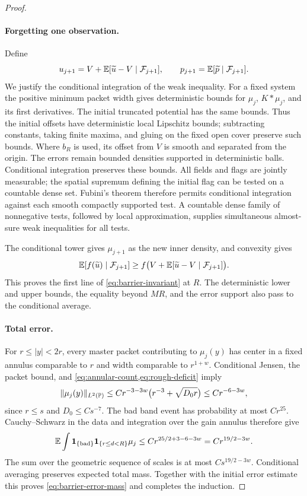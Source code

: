 \begin{proof}
\paragraph{Forgetting one observation.}
Define
\[
 u_{j+1}=V+\mathbb E[\widetilde u-V\mid\mathcal F_{j+1}],
 \qquad
 p_{j+1}=\mathbb E[\widetilde p\mid\mathcal F_{j+1}].
\]
We justify the conditional integration of the weak inequality.
For a fixed system the positive minimum packet width gives
deterministic bounds for $\mu_j$, $K*\mu_j$, and its first
derivatives.  The initial truncated potential has the same bounds.
Thus the initial offsets have deterministic local Lipschitz bounds;
subtracting constants, taking finite maxima, and gluing on the fixed
open cover preserve such bounds.  Where $b_R$ is used, its offset
from $V$ is smooth and separated from the origin.  The errors remain
bounded densities supported in deterministic balls.  Conditional
integration preserves these bounds.  All fields and flags are jointly
measurable; the spatial supremum defining the initial flag can be
tested on a countable dense set.  Fubini's theorem therefore permits
conditional integration against each smooth compactly supported
test.  A countable dense family of nonnegative tests, followed by
local approximation, supplies simultaneous almost-sure weak
inequalities for all tests.

The conditional tower gives $\mu_{j+1}$ as the new inner density,
and convexity gives
\[
 \mathbb E[f(\widetilde u)\mid\mathcal F_{j+1}]
 \ge f\bigl(V+\mathbb E[\widetilde u-V\mid\mathcal F_{j+1}]\bigr).
\]
This proves the first line of \cref{eq:barrier-invariant} at $R$.
The deterministic lower and upper bounds, the equality beyond
$MR$, and the error support also pass to the conditional average.

\paragraph{Total error.}
For $r\le |y|<2r$, every master packet contributing to $\mu_j(y)$
has center in a fixed annulus comparable to $r$ and width comparable
to $r^{1+w}$.  Conditional Jensen, the packet bound, and
\cref{eq:annular-count,eq:rough-deficit} imply
\[
 \lVert\mu_j(y)\rVert_{L^2(\mathbb P)}
 \le Cr^{-3-3w}\bigl(r^{-3}+\sqrt{D_0r}\bigr)
 \le Cr^{-6-3w},
\]
since $r\le s$ and $D_0\le Cs^{-7}$.  The bad band event has
probability at most $Cr^{25}$.  Cauchy--Schwarz in the data and
integration over the gain annulus therefore give
\[
 \mathbb E\int\mathbf 1_{\{\mathrm{bad}\}}\mathbf 1_{\{r\le d<R\}}\mu_j
 \le Cr^{25/2+3-6-3w}=Cr^{19/2-3w}.
\]
The sum over the geometric sequence of scales is at most
$Cs^{19/2-3w}$.  Conditional averaging preserves expected total mass.
Together with the initial error estimate this proves
\cref{eq:barrier-error-mass} and completes the induction.
\end{proof}
